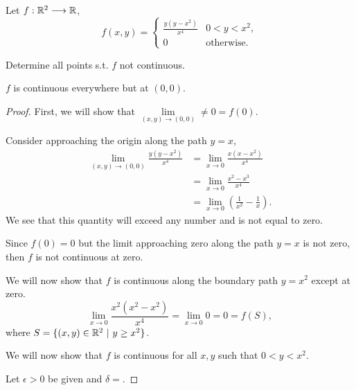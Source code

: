 \documentclass[../hw2]{subfiles}
\begin{document}
\begin{problem}[3]
Let $f:\mathbb{R}^2\longrightarrow\mathbb{R}$,\[
	f(x,y)=\begin{cases}
		\frac{y(y-x^2)}{x^4} & 0<y<x^2,          \\
		0                    & \text{otherwise}.
	\end{cases}
\]

Determine all points s.t. $f$ not continuous.
\end{problem}

\begin{proposition}
	$f$ is continuous everywhere but at $(0,0)$.
\end{proposition}
\begin{proof}
	First, we will show that $\lim\limits_{(x,y)\to(0,0)}\neq 0 = f(0)$.

	Consider approaching the origin along the path $y=x$,
	\begin{align*}
		\lim\limits_{(x,y)\to(0,0)}\frac{y(y-x^2)}{x^4} & = \lim\limits_{x\to 0} \frac{x(x-x^2)}{x^4}                    \\
		                                                & = \lim\limits_{x\to 0} \frac{x^2-x^3}{x^4}                     \\
		                                                & = \lim\limits_{x\to 0}\left( \frac{1}{x^2}-\frac{1}{x} \right)
		.\end{align*}
	We see that this quantity will exceed any number and is not equal to zero.

	Since $f(0)=0$ but the limit approaching zero along the path  $y=x$ is not zero, then  $f$ is not continuous at zero.


	We will now show that $f$ is continuous along the boundary path  $y=x^2$ except at zero. \[
		\lim\limits_{x\to 0}\frac{x^2(x^2-x^2)}{x^4}=\lim\limits_{x\to 0}0=0=f(S)
		,\] where $S=\{(x,y)\in \mathbb{R}^{2}\ |\ y\ge x^2\}$.

	We will now show that $f$ is continuous for all $x,y$ such that $0<y<x^2$.

	Let $\epsilon > 0$ be given and $\delta = $.
\end{proof}
\end{document}
